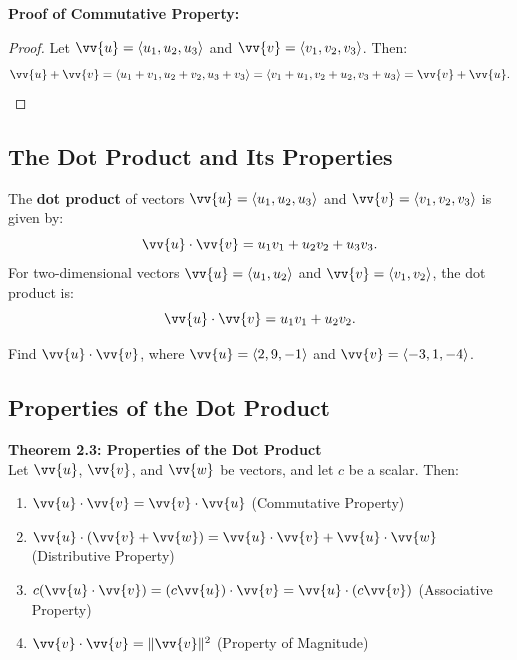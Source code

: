 \documentclass{article}
\begin{document}
\begin{proofbox}
    \textbf{Proof of Commutative Property:}
    \begin{proof}
    Let \(\vv{u} = \langle u_1, u_2, u_3 \rangle\) and \(\vv{v} = \langle v_1, v_2, v_3 \rangle\). Then:
    \[
    \vv{u} + \vv{v} = \langle u_1 + v_1, u_2 + v_2, u_3 + v_3 \rangle = \langle v_1 + u_1, v_2 + u_2, v_3 + u_3 \rangle = \vv{v} + \vv{u}.
    \]
    \end{proof}
\end{proofbox}

\subsection*{The Dot Product and Its Properties}

\begin{definitionbox}
    The \textbf{dot product} of vectors \(\vv{u} = \langle u_1, u_2, u_3 \rangle\) and \(\vv{v} = \langle v_1, v_2, v_3 \rangle\) is given by:
    \[
    \vv{u} \cdot \vv{v} = u_1 v_1 + u_2 v_2 + u_3 v_3.
    \]
    For two-dimensional vectors \(\vv{u} = \langle u_1, u_2 \rangle\) and \(\vv{v} = \langle v_1, v_2 \rangle\), the dot product is:
    \[
    \vv{u} \cdot \vv{v} = u_1 v_1 + u_2 v_2.
    \]
\end{definitionbox}

\begin{exercisebox}
    Find \(\vv{u} \cdot \vv{v}\), where \(\vv{u} = \langle 2, 9, -1 \rangle\) and \(\vv{v} = \langle -3, 1, -4 \rangle\).
\end{exercisebox}

\subsection*{Properties of the Dot Product}

\begin{theorembox}
    \textbf{Theorem 2.3: Properties of the Dot Product} \\
    Let \(\vv{u}\), \(\vv{v}\), and \(\vv{w}\) be vectors, and let \(c\) be a scalar. Then:
    \begin{enumerate}
        \item \(\vv{u} \cdot \vv{v} = \vv{v} \cdot \vv{u}\) \quad (Commutative Property)
        \item \(\vv{u} \cdot (\vv{v} + \vv{w}) = \vv{u} \cdot \vv{v} + \vv{u} \cdot \vv{w}\) \quad (Distributive Property)
        \item \(c(\vv{u} \cdot \vv{v}) = (c\vv{u}) \cdot \vv{v} = \vv{u} \cdot (c\vv{v})\) \quad (Associative Property)
        \item \(\vv{v} \cdot \vv{v} = \|\vv{v}\|^2\) \quad (Property of Magnitude)
    \end{enumerate}
\end{theorembox}
\end{document}
